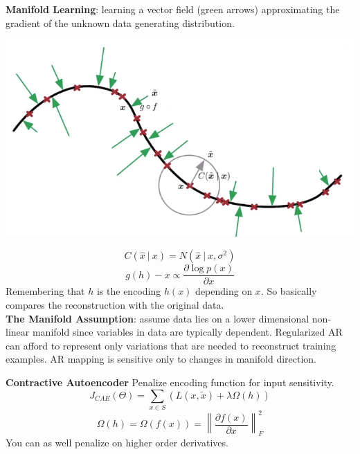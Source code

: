 \documentclass[10pt]{report}
\begin{document}
\begin{list}{}{}
\textbf{Manifold Learning}: learning a vector field (green arrows) approximating the gradient of the unknown data generating distribution.
\begin{center}
	\includegraphics[scale=0.5]{77.png}
\end{center}
$$C(\hat{x}\:|\:x) = N(\hat{x}\:|\:x,\sigma^2)$$
$$g(h)-x\propto\frac{\partial\log p(x)}{\partial x}$$
Remembering that $h$ is the encoding $h(x)$ depending on $x$. So basically compares the reconstruction with the original data.\\
\textbf{The Manifold Assumption}: assume data lies on a lower dimensional non-linear manifold since variables in data are typically dependent. Regularized AR can afford to represent only variations that are needed to reconstruct training examples. AR mapping is sensitive only to changes in manifold direction.
	\item \textbf{Contractive Autoencoder} Penalize encoding function for input sensitivity.
$$J_{CAE}(\Theta)=\sum_{x\in S} (L(x,\tilde{x}) + \lambda\Omega(h))$$
$$\Omega(h) = \Omega(f(x)) = \left\|\frac{\partial f(x)}{\partial x}\right\|^2_F$$
You can as well penalize on higher order derivatives.
\end{list}
\end{document}
